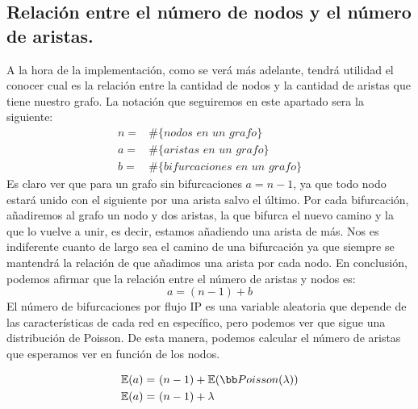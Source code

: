 \documentclass[twoside, 12pt]{epstfg}
\begin{document}
\subsection{Relación entre el número de nodos y el número de aristas.}
\label{sec:Analisis:Edges per node}
A la hora de la implementación, como se verá más adelante, tendrá utilidad el conocer cual es la relación entre la cantidad de nodos y la cantidad de aristas que tiene nuestro grafo. La notación que seguiremos en este apartado sera la siguiente:
\begin{align*}
	n =& \mathbin{\#}\{\textit{nodos en un grafo}\} \\
	a =& \mathbin{\#}\{\textit{aristas en un grafo}\} \\
	b =& \mathbin{\#}\{\textit{bifurcaciones en un grafo}\}
\end{align*}
Es claro ver que para un grafo sin bifurcaciones \(a = n-1\), ya que todo nodo estará unido con el siguiente por una arista salvo el último. Por cada bifurcación, añadiremos al grafo un nodo y dos aristas, la que bifurca el nuevo camino y la que lo vuelve a unir, es decir, estamos añadiendo una arista de más. Nos es indiferente cuanto de largo sea el camino de una bifurcación ya que siempre se mantendrá la relación de que añadimos una arista por cada nodo. En conclusión, podemos afirmar que la relación entre el número de aristas y nodos es:
\begin{equation*}
    a = (n - 1) + b
\end{equation*}
El número de bifurcaciones por flujo IP es una variable aleatoria que depende de las características de cada red en específico, pero podemos ver que sigue una distribución de Poisson. De esta manera, podemos calcular el número de aristas que esperamos ver en función de los nodos. 

\begin{align*}
    \mathbb{E}(a) =&\ (n - 1) + \mathbb{E}(\bb Poisson(\lambda))\\
    \mathbb{E}(a) =&\ (n - 1) + \lambda \
\end{align*}
\end{document}

